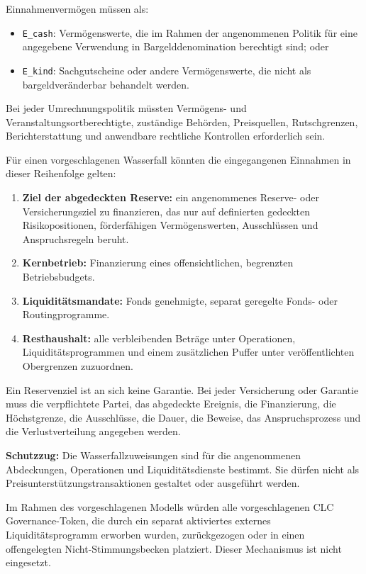 \documentclass[11pt]{article}
\begin{document}
Einnahmenvermögen müssen als:

\begin{itemize}[leftmargin=*]
\item \texttt{E\_cash}: Vermögenswerte, die im Rahmen der angenommenen Politik für eine angegebene Verwendung in Bargelddenomination berechtigt sind; oder
\item \texttt{E\_kind}: Sachgutscheine oder andere Vermögenswerte, die nicht als bargeldveränderbar behandelt werden.
\end{itemize}
Bei jeder Umrechnungspolitik müssten Vermögens- und Veranstaltungsortberechtigte, zuständige Behörden, Preisquellen, Rutschgrenzen, Berichterstattung und anwendbare rechtliche Kontrollen erforderlich sein.

Für einen vorgeschlagenen Wasserfall könnten die eingegangenen Einnahmen in dieser Reihenfolge gelten:

\begin{enumerate}[leftmargin=*]
\item \textbf{Ziel der abgedeckten Reserve:} ein angenommenes Reserve- oder Versicherungsziel zu finanzieren, das nur auf definierten gedeckten Risikopositionen, förderfähigen Vermögenswerten, Ausschlüssen und Anspruchsregeln beruht.
\item \textbf{Kernbetrieb:} Finanzierung eines offensichtlichen, begrenzten Betriebsbudgets.
\item \textbf{Liquiditätsmandate:} Fonds genehmigte, separat geregelte Fonds- oder Routingprogramme.
\item \textbf{Resthaushalt:} alle verbleibenden Beträge unter Operationen, Liquiditätsprogrammen und einem zusätzlichen Puffer unter veröffentlichten Obergrenzen zuzuordnen.
\end{enumerate}
Ein Reservenziel ist an sich keine Garantie. Bei jeder Versicherung oder Garantie muss die verpflichtete Partei, das abgedeckte Ereignis, die Finanzierung, die Höchstgrenze, die Ausschlüsse, die Dauer, die Beweise, das Anspruchsprozess und die Verlustverteilung angegeben werden.

\textbf{Schutzzug:} Die Wasserfallzuweisungen sind für die angenommenen Abdeckungen, Operationen und Liquiditätsdienste bestimmt. Sie dürfen nicht als Preisunterstützungstransaktionen gestaltet oder ausgeführt werden.

Im Rahmen des vorgeschlagenen Modells würden alle vorgeschlagenen CLC Governance-Token, die durch ein separat aktiviertes externes Liquiditätsprogramm erworben wurden, zurückgezogen oder in einen offengelegten Nicht-Stimmungsbecken platziert. Dieser Mechanismus ist nicht eingesetzt.
\end{document}
